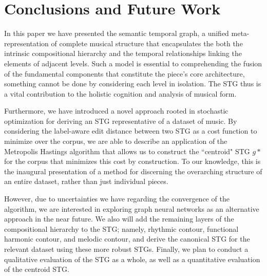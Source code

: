 \documentclass{article}
\begin{document}
\section{Conclusions and Future Work}
In this paper we have presented the semantic temporal graph, a unified meta-representation of complete musical structure that encapsulates the both the intrinsic compositional hierarchy and the temporal relationships linking the elements of adjacent levels. Such a model is essential to comprehending the fusion of the fundamental components that constitute the piece's core architecture, something cannot be done by considering each level in isolation. The STG thus is a vital contribution to the holistic cognition and analysis of musical form. 

Furthermore, we have introduced a novel approach rooted in stochastic optimization for deriving an STG representative of a dataset of music. By considering the label-aware edit distance between two STG as a cost function to minimize over the corpus, we are able to describe an application of the Metropolis Hastings algorithm that allows us to construct the ``centroid" STG $g*$ for the corpus that minimizes this cost by construction. To our knowledge, this is the inaugural presentation of a method for discerning the overarching structure of an entire dataset, rather than just individual pieces.

However, due to uncertainties we have regarding the convergence of the algorithm, we are interested in exploring graph neural networks as an alternative approach in the near future. We also will add the remaining layers of the compositional hierarchy to the STG; namely, rhythmic contour, functional harmonic contour, and melodic contour, and derive the canonical STG for the relevant dataset using these more robust STGs. Finally, we plan to conduct a qualitative evaluation of the STG as a whole, as well as a quantitative evaluation of the centroid STG. 



\end{document}
